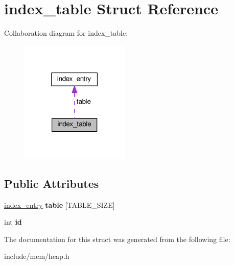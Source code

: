 \hypertarget{structindex__table}{}\section{index\+\_\+table Struct Reference}
\label{structindex__table}


Collaboration diagram for index\+\_\+table\+:
\nopagebreak
\begin{figure}[H]
\begin{center}
\leavevmode
\includegraphics[width=147pt]{structindex__table__coll__graph}
\end{center}
\end{figure}
\subsection*{Public Attributes}
\begin{DoxyCompactItemize}
\item 
\hyperlink{structindex__entry}{index\+\_\+entry} {\bfseries table} \mbox{[}T\+A\+B\+L\+E\+\_\+\+S\+I\+ZE\mbox{]}\hypertarget{structindex__table_ae69e0312bad59289ac303989d06c565d}{}\label{structindex__table_ae69e0312bad59289ac303989d06c565d}

\item 
int {\bfseries id}\hypertarget{structindex__table_a6e0e8e27a6a47e8ae2078b6fa447087f}{}\label{structindex__table_a6e0e8e27a6a47e8ae2078b6fa447087f}

\end{DoxyCompactItemize}


The documentation for this struct was generated from the following file\+:\begin{DoxyCompactItemize}
\item 
include/mem/heap.\+h\end{DoxyCompactItemize}
